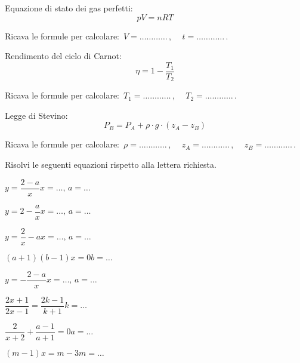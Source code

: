 \begin{esercizio}
\label{ese:20.65}
Equazione di stato dei gas perfetti:
\begin{equation*}
  pV=nRT
\end{equation*}

Ricava le formule per calcolare:~$V=\ldots\ldots\ldots\ldots$\,, $\quad 
t=\ldots\ldots\ldots\ldots$\,.
\end{esercizio}

\begin{esercizio}
\label{ese:20.66}
Rendimento del ciclo di Carnot:
\begin{equation*}
  \eta =1-\dfrac{T_{1}}{T_{2}}
\end{equation*}

Ricava le formule per calcolare:~$T_1=\ldots\ldots\ldots\ldots$\,, $\quad 
T_2=\ldots\ldots\ldots\ldots$\,.
\end{esercizio}

\begin{esercizio}
\label{ese:20.67}
Legge di Stevino:
\begin{equation*}
  P_{B}=P_{A}+\rho \cdot g\cdot (z_{A}-z_{B})
\end{equation*}

Ricava le formule per calcolare:~$\rho=\ldots\ldots\ldots\ldots$\,, $\quad 
z_A=\ldots\ldots\ldots\ldots$\,, $\quad z_B =\ldots\ldots\ldots\ldots$\,.
\end{esercizio}


\begin{esercizio}
\label{ese:20.68}
Risolvi le seguenti equazioni rispetto alla lettera richiesta.
\begin{multicols}{2}
\TabPositions{2.5cm}
\begin{enumeratea}
 \item $y=\dfrac{2-a}{x}$\hfill$x=\ldots,\,a=\ldots$
 \item $y=2-\dfrac{a}{x}$\hfill$x=\ldots,\,a=\ldots$
 \item $y=\dfrac{2}{x}-a$\hfill$x=\ldots,\,a=\ldots$
 \item $(a+1)(b-1)x=0$\hfill$b=\ldots$
 \item $y=-{\dfrac{2-a}{x}}$\hfill$x=\ldots,\,a=\ldots$
 \item $\dfrac{2x+1}{2x-1}=\dfrac{2k-1}{k+1}$\hfill$k=\ldots$
 \item $\dfrac{2}{x+2}+\dfrac{a-1}{a+1}=0$\hfill$a=\ldots$
 \item $(m-1)x=m-3$\hfill$m=\ldots$
\end{enumeratea}
\end{multicols}
\end{esercizio}

